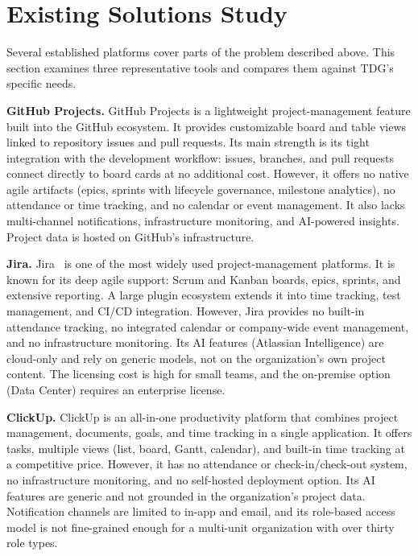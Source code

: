 \section{Existing Solutions Study}

Several established platforms cover parts of the problem described above. This section
examines three representative tools and compares them against TDG's specific needs.

\textbf{GitHub Projects.} GitHub Projects is a lightweight project-management feature built into
the GitHub ecosystem. It provides customizable board and table views linked to repository issues
and pull requests. Its main strength is its tight integration with the development workflow:
issues, branches, and pull requests connect directly to board cards at no additional cost.
However, it offers no native agile artifacts (epics, sprints with lifecycle governance,
milestone analytics), no attendance or time tracking, and no calendar or event management. It
also lacks multi-channel notifications, infrastructure monitoring, and AI-powered insights.
Project data is hosted on GitHub's infrastructure.

\textbf{Jira.} Jira~\cite{jira} is one of the most widely used project-management platforms. It
is known for its deep agile support: Scrum and Kanban boards, epics, sprints, and extensive
reporting. A large plugin ecosystem extends it into time tracking, test management, and CI/CD
integration. However, Jira provides no built-in attendance tracking, no integrated calendar or
company-wide event management, and no infrastructure monitoring. Its AI features (Atlassian
Intelligence) are cloud-only and rely on generic models, not on the organization's own project
content. The licensing cost is high for small teams, and the on-premise option (Data Center)
requires an enterprise license.

\textbf{ClickUp.} ClickUp is an all-in-one productivity platform that combines project
management, documents, goals, and time tracking in a single application. It offers tasks,
multiple views (list, board, Gantt, calendar), and built-in time tracking at a competitive
price. However, it has no attendance or check-in/check-out system, no infrastructure
monitoring, and no self-hosted deployment option. Its AI features are generic and not grounded
in the organization's project data. Notification channels are limited to in-app and email, and
its role-based access model is not fine-grained enough for a multi-unit organization with over
thirty role types.

